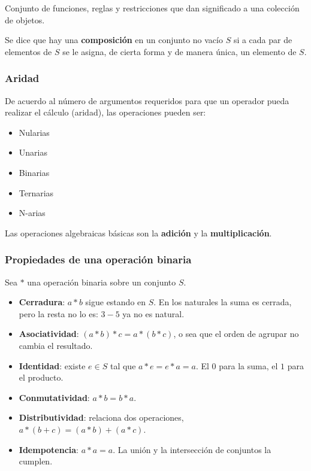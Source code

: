 \documentclass[11pt,letterpaper]{article}
\begin{document}
\begin{definicion}
    Conjunto de funciones, reglas y restricciones que dan significado a
    una colección de objetos.
\end{definicion}

Se dice que hay una \textbf{composición} en un conjunto no vacío $S$
si a cada par de elementos de $S$ se le asigna, de cierta forma y de
manera única, un elemento de $S$.

\subsubsection*{Aridad}

De acuerdo al número de argumentos requeridos para que un operador
pueda realizar el cálculo (aridad), las operaciones pueden ser:

\begin{itemize}[itemsep=0.05em]
    \item Nularias
    \item Unarias
    \item Binarias
    \item Ternarias
    \item N-arias
\end{itemize}

Las operaciones algebraicas básicas son la \textbf{adición} y la
\textbf{multiplicación}.

\subsubsection*{Propiedades de una operación binaria}

Sea $*$ una operación binaria sobre un conjunto $S$.

\begin{itemize}[itemsep=0.2em]
    \item \textbf{Cerradura}: $a * b$ sigue estando en $S$. En los
          naturales la suma es cerrada, pero la resta no lo es:
          $3 - 5$ ya no es natural.
    \item \textbf{Asociatividad}: $(a * b) * c = a * (b * c)$, o sea
          que el orden de agrupar no cambia el resultado.
    \item \textbf{Identidad}: existe $e \in S$ tal que
          $a * e = e * a = a$. El $0$ para la suma, el $1$ para el
          producto.
    \item \textbf{Conmutatividad}: $a * b = b * a$.
    \item \textbf{Distributividad}: relaciona dos operaciones,
          $a * (b + c) = (a * b) + (a * c)$.
    \item \textbf{Idempotencia}: $a * a = a$. La unión y la
          intersección de conjuntos la cumplen.
\end{itemize}
\end{document}
